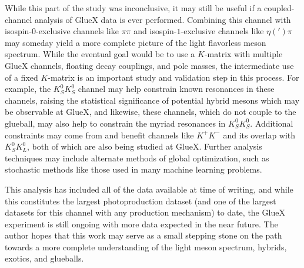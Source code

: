 While this part of the study was inconclusive, it may still be useful if a coupled-channel analysis of GlueX data is ever performed. Combining this channel with isospin-$0$-exclusive channels like $\pi\pi$ and isospin-$1$-exclusive channels like $\eta(')\pi$ may someday yield a more complete picture of the light flavorless meson spectrum. While the eventual goal would be to use a $K$-matrix with multiple GlueX channels, floating decay couplings, and pole masses, the intermediate use of a fixed $K$-matrix is an important study and validation step in this process. For example, the $K_S^0K_S^0$ channel may help constrain known resonances in these channels, raising the statistical significance of potential hybrid mesons which may be observable at GlueX, and likewise, these channels, which do not couple to the glueball, may also help to constrain the myriad resonances in $K_S^0K_S^0$. Additional constraints may come from and benefit channels like $K^+K^-$ and its overlap with $K_S^0K_L^0$, both of which are also being studied at GlueX. Further analysis techniques may include alternate methods of global optimization, such as stochastic methods like those used in many machine learning problems.

This analysis has included all of the data available at time of writing, and while this constitutes the largest photoproduction dataset (and one of the largest datasets for this channel with any production mechanism) to date, the GlueX experiment is still ongoing with more data expected in the near future. The author hopes that this work may serve as a small stepping stone on the path towards a more complete understanding of the light meson spectrum, hybrids, exotics, and glueballs.
